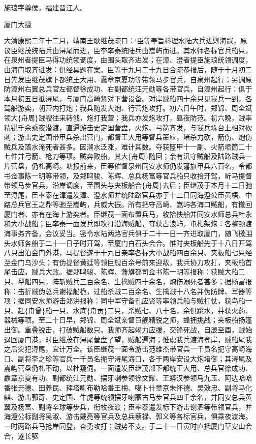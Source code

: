 \documentclass[]{article}
\begin{document}
施琅字尊侯，福建晋江人。

厦门大捷

大清康熙二年十二月，靖南王耿继茂疏曰：`臣等奉旨料理水陆大兵进剿海寇，原议臣继茂统陆兵由浔尾而进，臣李率泰统陆兵由嵩屿而进。其水师各标官兵船只，在泉州者提臣马得功统领调度，由围头取齐进发；在漳、澄者提臣施琅统领调度，由海门取齐进发：俱经具题在案。臣等于九月二十九日合疏恭报后，随于十月初二日先发臣继茂旗下都统王大用、纛章京夏功等带领马步官兵，自泉州起行；另调原防漳州右翼总兵官左都督徐成功、右副都统汪元勋等各带官兵，自漳州起行：俱于本月初五日抵浔尾，与厦门高崎紧对下营设备。对岸贼船四十余只见我兵一到，各驾船游奕，朝营内打炮；我兵随发大炮、行营炮攻打。初六日午时，郑锦、周全斌领大\{舟周\}贼艘往来转戗，炮打我营；我兵亦发炮攻打，昼夜防范。初六晚，贼率精锐千余乘夜潜渡，直逼游击史定国营盘，火炮、弓箭齐发，与我兵垛台上相对砍刺；游击史定国带甲兵杀出营门，都督王大用等督兵策应，堵杀力砍，箭伤、炮伤贼兵及落水淹死者甚多。因潮水泛涨，难计其数。夺获盔甲十一副、火箭喷筒二十七件并弓箭、枪刀等项。贼奔败船，其大\{舟周\}随回；余有汛守贼船及陆路贼兵一片营盘，仍札高崎。塘报前来，臣等催督泉州同安水师仍发藩旗甲兵六百名，令都书佥事陈一明等带领，及郑鸣骏、陈辉、总兵杨富等官兵船只收拾开驾，听马提督带领马步官兵，沿岸调度，至围头与夹板船合\{舟周\}去后；臣继茂于本月十二日驰至浔尾，臣率泰在漳遣发漳、澄水师并统陆路官兵亦于十二日同海澄公臣黄梧、中路总兵官王之鼎等驰至嵩屿，兵威大振。所有把守高崎、嵩屿各海口贼船，有撤回厦门者、亦有在海上游奕者。臣继茂一面布置兵马，收拾快船并同安水师总兵杜永和大小战船；臣率泰一面发兵即攻打沿海贼船，夺获古浪屿，屯札架炮：各整顿渡海事务齐备，会议妥当。密令水陆两路官兵俱于二十一日一齐进取厦门，随飞檄围头水师各船于二十一日子时开驾，至厦门白石头会合。惟时夹板船先于十八日开驾八只出泊金门外港，马提督遂于十九日亲率各标大小战船四百余只、夹板船七只经至金门乌沙头；有伪提督黄廷等领巨舰百余号前来迎敌，我兵协力攻打，夹板船首尾击应，贼兵大败。据郑鸣骏、陈辉、藩旗都司佥书陈一明等报称：获贼大船二只、犁船四只，阵斩贼兵三百余名、生擒贼四十余名，炮伤溺死者甚多；据杨富报称：击折贼伪总兵谢福船桅，过船杀贼二百余名、生擒贼十八名并伪防牌、军器等项；据同安水师游击郑洪报称：同中军守备孔应贤等率领兵船与贼打仗，获鸟船一只、赶\{舟曾\}船一只、水底\{舟贡\}二只，杀贼七、八十名，余俱跳水，并获火药、器械等项。至二十日早，郑锦、周全斌亲督巨舰精锐之师，蜂拥挑战；夹板船扬篷出御。重叠锐击，打破贼船数只。我师齐起竭力应援，交锋死战，自辰至酉，贼始退回厦门港。时臣继茂在浔尾营盘了望，贼船遍海；惟虑我兵渡海登岸，贼船尾我之后突犯浔尾，宜计万全。该臣继茂一面令游击范维杰带官兵一千员名扼守高崎海口、副将李之珍等官兵一千员名扼守浔尾海口，各于两岸安设大炮堵御；其浔尾及嵩屿营盘仍札不动，以杜窥伺。一面遣发臣继茂部下都统王大用、总兵官徐成功、纛章京夏有功、副都统江元勋、摆牙喇参领徐文耀、王蟒汉参领马九玉、阿达哈哈番张元德、田养民、拜塔喇布勒哈番王梅、噶卜什章京朱怀德、吴效忠、副将马化麒、游击郭奇、史定国、牛虎等统领摆牙喇蒙古马步官兵四千余名，并同安总兵黄翼及杨富、副将辛球等步兵，衔枚夜渡；臣率泰遣发标下游击谢泗等带领官兵，并海澄公标副将吴淑、游击戴亮等官兵及总兵蔡禄、郭义等各标官兵，俱乘夜渡海。一时两路兵马抢岸同登，奋勇攻打；贼势不支。于二十一日寅时直抵厦门草安山会合，遂长驱
\end{document}
